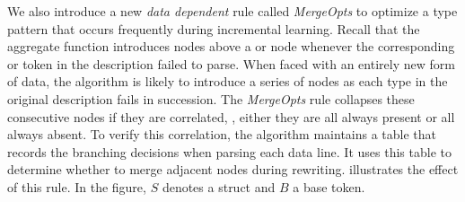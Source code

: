 We also introduce a new {\em data dependent} rule called {\em MergeOpts}
to optimize a type pattern that occurs frequently during incremental
learning.  Recall that the aggregate function
introduces  nodes above a  or  node 
whenever the corresponding  or  token in 
the description failed to 
parse. When faced with an entirely new form of data, 
the algorithm is likely to introduce a series of  nodes as
each type in the original description fails in succession. 
The {\em MergeOpts} rule collapses these consecutive  nodes if they
are correlated, \ie{}, either they are all always present or all always
absent.  To verify this correlation, the algorithm maintains a
table that records the branching decisions when parsing each
data line. It uses this table to determine whether to merge
adjacent  nodes during rewriting. 
 illustrates the effect of this rule.  In the figure,
$S$ denotes a struct and $B$ a base token.

